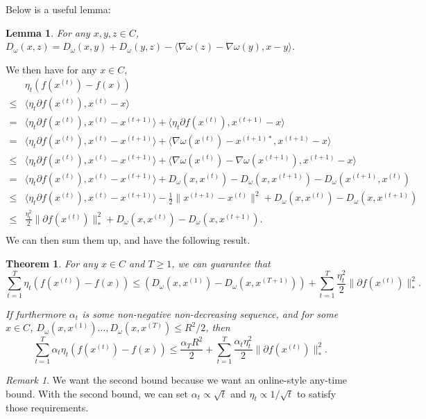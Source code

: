 \documentclass[openany]{book}
\newtheorem{lemma}{Lemma}[chapter]
\newtheorem{theorem}{Theorem}[chapter]
\theoremstyle{definition}
\theoremstyle{remark}
\newtheorem*{remark}{Remark}
\begin{document}
Below is a useful lemma:
\begin{lemma}
    For any $x,y,z\in C$, $D_{\omega}(x,z)=D_{\omega}(x,y)+D_{\omega}(y,z)-\langle\nabla\omega(z)-\nabla\omega(y),x-y\rangle$.
\end{lemma}
We then have for any $x\in C$,
\begin{equation*}
    \begin{split}
         & \eta_t\left(f(x^{(t)})-f(x)\right) \\
        \le & \langle\eta_t\partial f(x^{(t)}),x^{(t)}-x\rangle \\
        = & \langle\eta_t\partial f(x^{(t)}),x^{(t)}-x^{(t+1)}\rangle+\langle\eta_t\partial f(x^{(t)}),x^{(t+1)}-x\rangle \\
        = & \langle\eta_t\partial f(x^{(t)}),x^{(t)}-x^{(t+1)}\rangle+\langle\nabla\omega(x^{(t)})-x^{(t+1)*},x^{(t+1)}-x\rangle \\
        \le & \langle\eta_t\partial f(x^{(t)}),x^{(t)}-x^{(t+1)}\rangle+\langle\nabla\omega(x^{(t)})-\nabla\omega(x^{(t+1)}),x^{(t+1)}-x\rangle \\
        = & \langle\eta_t\partial f(x^{(t)}),x^{(t)}-x^{(t+1)}\rangle+D_{\omega}(x,x^{(t)})-D_{\omega}(x,x^{(t+1)})-D_{\omega}(x^{(t+1)},x^{(t)}) \\
        \le & \langle\eta_t\partial f(x^{(t)}),x^{(t)}-x^{(t+1)}\rangle-\frac{1}{2}\|x^{(t+1)}-x^{(t)}\|^2+D_{\omega}(x,x^{(t)})-D_{\omega}(x,x^{(t+1)}) \\
        \le & \frac{\eta_t^2}{2}\|\partial f(x^{(t)})\|_*^2+D_{\omega}(x,x^{(t)})-D_{\omega}(x,x^{(t+1)}). \\
    \end{split}
\end{equation*}
We can then sum them up, and have the following result.
\begin{theorem}\label{thm:MDGuarantee}
    For any $x\in C$ and $T\ge1$, we can guarantee that
    \begin{equation*}
        \sum_{t=1}^{T}\eta_t\left(f(x^{(t)})-f(x)\right)\le\left(D_{\omega}(x,x^{(1)})-D_{\omega}(x,x^{(T+1)})\right)+\sum_{t=1}^{T}\frac{\eta_t^2}{2}\|\partial f(x^{(t)})\|_*^2.
    \end{equation*}

    If furthermore $\alpha_t$ is some non-negative non-decreasing sequence, and for some $x\in C$, $D_{\omega}(x,x^{(1)})\ldots,D_{\omega}(x,x^{(T)})\le R^2/2$, then
    \begin{equation*}
        \sum_{t=1}^{T}\alpha_t\eta_t\left(f(x^{(t)})-f(x)\right)\le \frac{\alpha_{T}R^2}{2}+\sum_{t=1}^{T}\frac{\alpha_t\eta_t^2}{2}\|\partial f(x^{(t)})\|_*^2.
    \end{equation*}
\end{theorem}
\begin{remark}
    We want the second bound because we want an online-style any-time bound. With the second bound, we can set $\alpha_t\propto\sqrt{t}$ and $\eta_t\propto1/\sqrt{t}$ to satisfy those requirements.
\end{remark}
\end{document}
